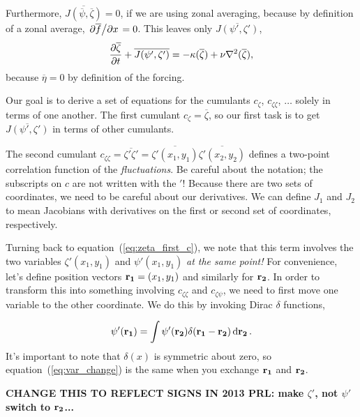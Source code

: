 \documentclass{paper}
\newcommand*{\mean}[1]{\overline{#1}}
\newcommand{\cz}{c_\zeta}
\newcommand{\czz}{c_{\zeta\zeta}}
\newcommand{\czp}{c_{\zeta\psi}}
\newcommand{\rr}[1]{\vb{r_{#1}}}
\begin{document}
Furthermore, $\mean{J(\mean{\psi}, \mean{\zeta})} = 0$, if we are using zonal averaging, because by definition of a zonal average, $\pdv*{\mean{f}}{x} = 0$. This leaves only $\mean{J(\psi', \zeta')}$,
% 
\begin{equation}
  \label{eq:zeta_first_c}
  \pdv{\mean{\zeta}}{t} + \mean{J(\psi', \zeta')}  = -\kappa (\mean{\zeta}) + \nu \laplacian{(\mean{\zeta})},
\end{equation}
because $\mean{\eta} = 0$ by definition of the forcing.

Our goal is to derive a set of equations for the cumulants $\cz$, $\czz$, $\ldots$ solely in terms of one another. The first cumulant $\cz = \mean{\zeta}$, so our first task is to get $\mean{J(\psi', \zeta')}$ in terms of other cumulants.

The second cumulant $\czz = \mean{\zeta' \zeta'} = \mean{\zeta'(x_1, y_1)} \mean{\zeta'(x_2, y_2)}$ defines a two-point correlation function of the \emph{fluctuations}. Be careful about the notation; the subscripts on $c$ are not written with the $'$! Because there are two sets of coordinates, we need to be careful about our derivatives. We can define $J_1$ and $J_2$ to mean Jacobians with derivatives on the first or second set of coordinates, respectively.

Turning back to equation~(\ref{eq:zeta_first_c}), we note that this term involves the two variables $\zeta'(x_1, y_1)$ and $\psi'(x_1, y_1)$ \emph{at the same point!} For convenience, let's define position vectors $\rr1 = (x_1, y_1)$ and similarly for $\rr2$. In order to transform this into something involving $\czz$ and $\czp$, we need to first move one variable to the other coordinate. We do this by invoking Dirac $\delta$ functions,

\begin{equation}
  \label{eq:var_change}
  \psi'(\rr1) = \int \psi'(\rr2) \delta(\rr1 - \rr2) \dd{\rr2}.
\end{equation}
It's important to note that $\delta(x)$ is symmetric about zero, so equation~(\ref{eq:var_change}) is the same when you exchange $\rr1$ and $\rr2$.

\textbf{CHANGE THIS TO REFLECT SIGNS IN 2013 PRL: make $\zeta'$, not $\psi'$ switch to $\rr2$...}
\end{document}
